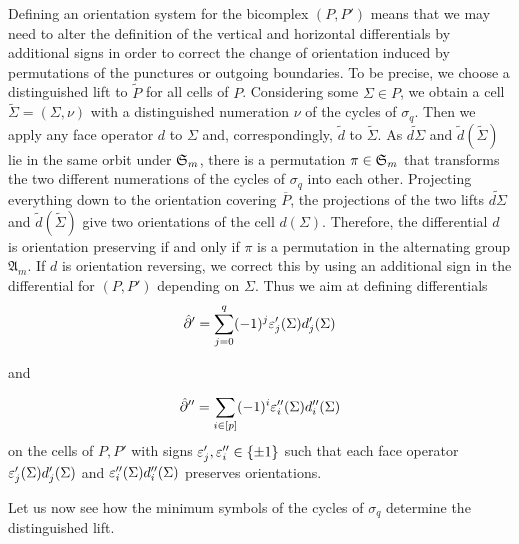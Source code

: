 Defining an orientation system for the bicomplex $(P, P')$ means 
that we may need to alter the definition of the vertical and horizontal differentials by additional signs in order to correct the change of orientation induced by permutations of the punctures or outgoing boundaries.
To be precise, we choose a distinguished lift to $\tilde P$ for all cells of $P$.
Considering some $\Sigma \in P$, we obtain a cell $\tilde \Sigma = (\Sigma, \nu)$ with a distinguished numeration $\nu$ of the cycles of $\sigma_q$.
Then we apply any face operator $d$ to $\Sigma$ and, correspondingly, $\tilde d$ to $\tilde \Sigma$. 
As $\widetilde{d\Sigma}$ and $\tilde {d} (\tilde \Sigma)$ lie in the same orbit under $\mathfrak S_m$, 
there is a permutation $\pi \in \mathfrak S_m$ that transforms the two different numerations of the cycles of $\sigma_q$ into each other.
Projecting everything down to the orientation covering $\overline P$, 
the projections of the two lifts $\widetilde{d\Sigma}$ and $\tilde d (\tilde \Sigma)$ give two orientations of the cell $d(\Sigma)$.
Therefore, the differential $d$ is orientation preserving if and only if $\pi$ is a permutation in the alternating group $\mathfrak A_m$.
If $d$ is orientation reversing, we correct this by using an additional sign in the differential for $(P, P')$ depending on $\Sigma$.
Thus we aim at defining differentials 
\[
   \hat {\partial}' = \sum_{j = 0}^{q} (-1)^j \varepsilon_j'(\Sigma) d_j'(\Sigma)
\]

and 

\[
   \hat {\partial}'' = \sum_{i \in [p]} (-1)^i \varepsilon_i''(\Sigma) d_i''(\Sigma)
\]
on the cells of $P, P'$ with signs $\varepsilon_j', \varepsilon_i'' \in \{\pm 1\}$ such that each face operator $\varepsilon_j'(\Sigma) d_j'(\Sigma)$ and $\varepsilon_i''(\Sigma) d_i''(\Sigma)$ preserves orientations.

Let us now see how the minimum symbols of the cycles of $\sigma_q$ determine the distinguished lift.

